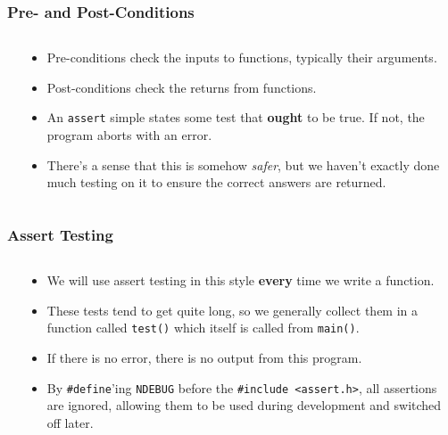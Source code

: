 

\begin{frame}[fragile]
\frametitle{Pre- and Post-Conditions}
\begin{columns}

\begin{column}{0.40\textwidth}

\end{column}

\begin{column}{0.55\textwidth}
\begin{itemize}[<+->]
\item Pre-conditions check the inputs to functions, typically their arguments.
\item Post-conditions check the returns from functions.
\item An {\tt assert} simple states some test that {\bf ought} to be true. If not, the
program aborts with an error.
\item There's a sense that this is somehow {\it safer}, but we haven't exactly done much testing on it to ensure the correct answers are returned.
\end{itemize}
\end{column}

\end{columns}
\end{frame}



\begin{frame}[fragile]
\frametitle{Assert Testing}
\begin{columns}

\begin{column}{0.40\textwidth}

\end{column}

\begin{column}{0.55\textwidth}
\begin{itemize}[<+->]
\item We will use assert testing in this style {\bf every} time we write a function.
\item These tests tend to get quite long, so we generally collect them in a function called {\tt test()} which itself is called from {\tt main()}.
\item If there is no error, there is no output from this program.
\item By \verb^#define^'ing \verb^NDEBUG^ before the {\tt \#include <assert.h>}, all assertions are ignored, allowing them to be used during development and switched off later.
\end{itemize}
\end{column}

\end{columns}
\end{frame}

